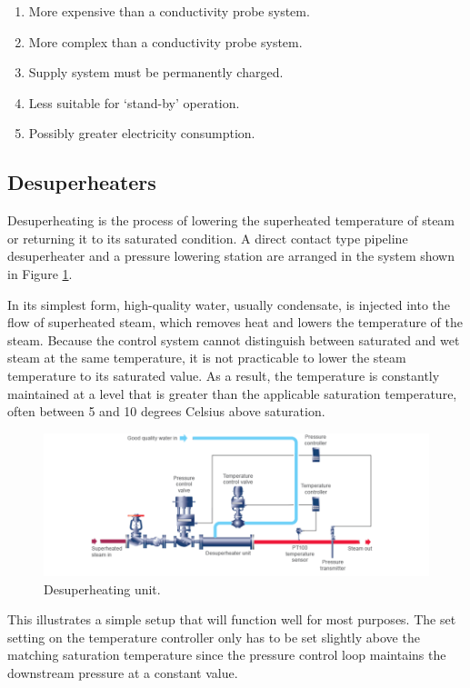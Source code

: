\begin{enumerate}
\item
  More expensive than a conductivity probe system.
\item
  More complex than a conductivity probe system.
\item
  Supply system must be permanently charged.
\item
  Less suitable for `stand-by' operation.
\item
  Possibly greater electricity consumption.
\end{enumerate}





\subsection{Desuperheaters}

Desuperheating is the process of lowering the superheated temperature of
steam or returning it to its saturated condition. A direct contact type
pipeline desuperheater and a pressure lowering station are arranged in
the system shown in Figure \ref{fig:Desuperheating unit}.



In its simplest form, high-quality water, usually condensate, is injected
into the flow of superheated steam, which removes heat and lowers the
temperature of the steam. Because the control system cannot distinguish
between saturated and wet steam at the same temperature, it is not
practicable to lower the steam temperature to its saturated value. As a
result, the temperature is constantly maintained at a level that is
greater than the applicable saturation temperature, often between 5 and
10 degrees Celsius above saturation.

\begin{figure}[h!]
  \centering
  \includegraphics[width=0.8\linewidth]{figs/control_instrumentation/image7.png}
  \caption{Desuperheating unit.}
  \label{fig:Desuperheating unit}
\end{figure}


This illustrates a simple setup that will function well for most
purposes. The set setting on the temperature controller only has to be
set slightly above the matching saturation temperature since the
pressure control loop maintains the downstream pressure at a constant
value.

